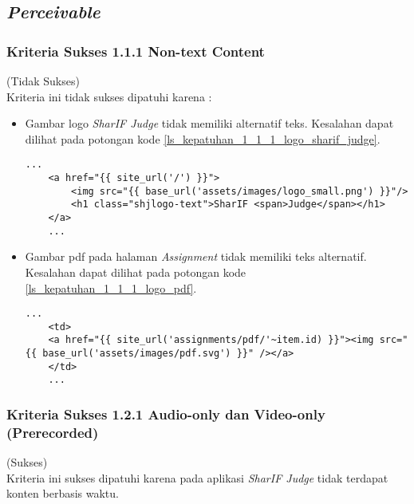 \subsection{\textit{Perceivable}}
\label{subsec:kepatuhan_perceivable}

\subsubsection{Kriteria Sukses 1.1.1 Non-text Content}
\label{subsubsec:kepatuhan_kriteria_1.1.1}
(Tidak Sukses) \\

Kriteria ini tidak sukses dipatuhi karena :
\begin{itemize}
	\item Gambar logo \textit{SharIF Judge} tidak memiliki alternatif teks. Kesalahan dapat dilihat pada potongan kode \ref{ls_kepatuhan_1_1_1_logo_sharif_judge}.
	\begin{lstlisting}[basicstyle=\ttfamily, frame=single,
	columns=fullflexible, keepspaces=true, breaklines=true, label=ls_kepatuhan_1_1_1_logo_sharif_judge, caption=Kriteria Sukses 1.1.1 - Logo SharIF Judge Tidak Diberi Teks Alternatif]
	...
	<a href="{{ site_url('/') }}">
		<img src="{{ base_url('assets/images/logo_small.png') }}"/>
		<h1 class="shjlogo-text">SharIF <span>Judge</span></h1>
	</a>
	...
	\end{lstlisting}
	\item Gambar pdf pada halaman \textit{Assignment} tidak memiliki teks alternatif. Kesalahan dapat dilihat pada potongan kode \ref{ls_kepatuhan_1_1_1_logo_pdf}.
	\begin{lstlisting}[basicstyle=\ttfamily, frame=single,
	columns=fullflexible, keepspaces=true, breaklines=true, label=ls_kepatuhan_1_1_1_logo_pdf, caption=Kriteria Sukses 1.1.1 - Gambar PDF Tidak Diberi Teks Alternatif]
	...
	<td>
	<a href="{{ site_url('assignments/pdf/'~item.id) }}"><img src="{{ base_url('assets/images/pdf.svg') }}" /></a>
	</td>
	...
	\end{lstlisting}
\end{itemize}

\subsubsection{Kriteria Sukses 1.2.1 Audio-only dan Video-only (Prerecorded)}
\label{subsubsec:kepatuhan_kriteria_1.2.1}
(Sukses) \\

Kriteria ini sukses dipatuhi karena pada aplikasi \textit{SharIF Judge} tidak terdapat konten berbasis waktu.


